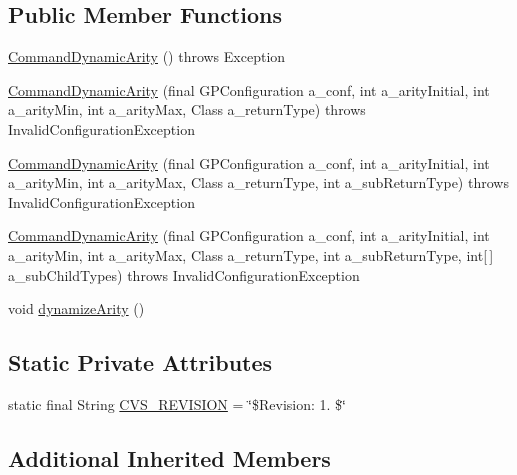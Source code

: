 \subsection*{Public Member Functions}
\begin{DoxyCompactItemize}
\item 
\hyperlink{classorg_1_1jgap_1_1gp_1_1_command_dynamic_arity_a91409347451d0ed427fe8df98a102360}{Command\-Dynamic\-Arity} ()  throws Exception 
\item 
\hyperlink{classorg_1_1jgap_1_1gp_1_1_command_dynamic_arity_a8fa173e9e71f91467f972b011c3f04ed}{Command\-Dynamic\-Arity} (final G\-P\-Configuration a\-\_\-conf, int a\-\_\-arity\-Initial, int a\-\_\-arity\-Min, int a\-\_\-arity\-Max, Class a\-\_\-return\-Type)  throws Invalid\-Configuration\-Exception 
\item 
\hyperlink{classorg_1_1jgap_1_1gp_1_1_command_dynamic_arity_a32c0eb4d5638e608e3295555e0989fd3}{Command\-Dynamic\-Arity} (final G\-P\-Configuration a\-\_\-conf, int a\-\_\-arity\-Initial, int a\-\_\-arity\-Min, int a\-\_\-arity\-Max, Class a\-\_\-return\-Type, int a\-\_\-sub\-Return\-Type)  throws Invalid\-Configuration\-Exception 
\item 
\hyperlink{classorg_1_1jgap_1_1gp_1_1_command_dynamic_arity_af95948e29b24e768615aebc8bdc202d8}{Command\-Dynamic\-Arity} (final G\-P\-Configuration a\-\_\-conf, int a\-\_\-arity\-Initial, int a\-\_\-arity\-Min, int a\-\_\-arity\-Max, Class a\-\_\-return\-Type, int a\-\_\-sub\-Return\-Type, int\mbox{[}$\,$\mbox{]} a\-\_\-sub\-Child\-Types)  throws Invalid\-Configuration\-Exception 
\item 
void \hyperlink{classorg_1_1jgap_1_1gp_1_1_command_dynamic_arity_a4077850471373a67d40569e810b9a170}{dynamize\-Arity} ()
\end{DoxyCompactItemize}
\subsection*{Static Private Attributes}
\begin{DoxyCompactItemize}
\item 
static final String \hyperlink{classorg_1_1jgap_1_1gp_1_1_command_dynamic_arity_aefd7dd683f00353b2fc7d25ab7686784}{C\-V\-S\-\_\-\-R\-E\-V\-I\-S\-I\-O\-N} = \char`\"{}\$Revision\-: 1. \$\char`\"{}
\end{DoxyCompactItemize}
\subsection*{Additional Inherited Members}


